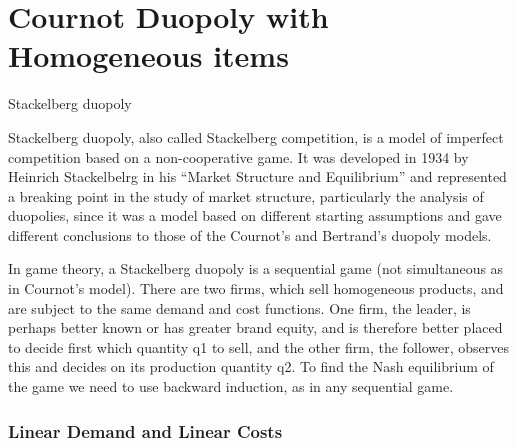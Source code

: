 \section{Cournot Duopoly with Homogeneous items}

Stackelberg duopoly

Stackelberg duopoly, also called Stackelberg competition, is a model of imperfect competition based on a non-cooperative game. It was developed in 1934 by Heinrich Stackelbelrg in his “Market Structure and Equilibrium” and represented a breaking point in the study of market structure, particularly the analysis of duopolies, since it was a model based on different starting assumptions and gave different conclusions to those of the Cournot’s and Bertrand’s duopoly models.

In game theory, a Stackelberg duopoly is a sequential game (not simultaneous as in Cournot’s model). There are two firms, which sell homogeneous products, and are subject to the same demand and cost functions. One firm, the leader, is perhaps better known or has greater brand equity, and is therefore better placed to decide first which quantity q1 to sell, and the other firm, the follower, observes this and decides on its production quantity q2. To find the Nash equilibrium of the game we need to use backward induction, as in any sequential game.

\newpage

\subsubsection{Linear Demand and Linear Costs}

